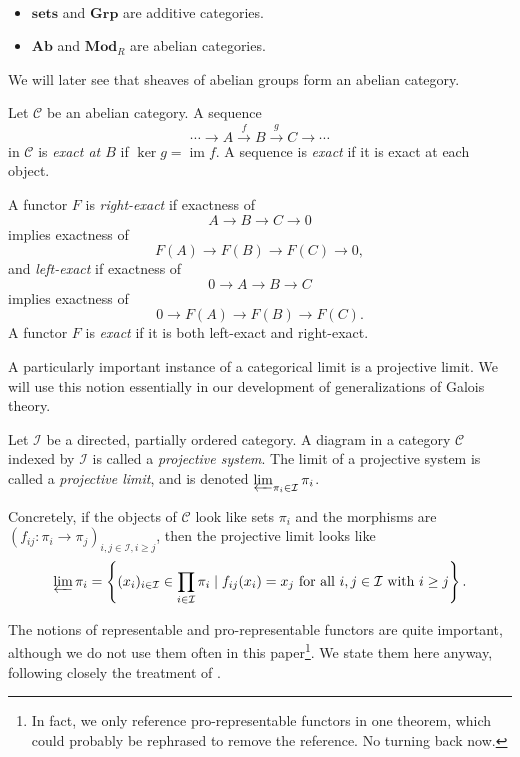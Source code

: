\documentclass[11pt,openany]{book} %
\begin{document}
\begin{example}\
	\begin{itemize}
	\item $\mathbf{sets}$ and $\mathbf{Grp}$ are additive categories.
	\item $\mathbf{Ab}$ and $\mathbf{Mod}_R$ are abelian categories.
    \end{itemize}
We will later see that sheaves of abelian groups form an abelian category.
\end{example}

\begin{definition}
Let $\mathcal{C}$ be an abelian category. A sequence
\[
\cdots \rightarrow A \xrightarrow{f} B \xrightarrow{g} C \rightarrow \cdots
\]
in $\mathcal{C}$ is \emph{exact at $B$} if $\operatorname{ker} g = \operatorname{im} f$. A sequence is \emph{exact} if it is exact at each object.

A functor $F$ is \emph{right-exact} if exactness of
\[
A \to B \to C \to 0
\]
implies exactness of
\[
F(A) \to F(B) \to F(C) \to 0,
\]
and \emph{left-exact} if exactness of 
\[
0 \to A \to B \to C
\]
implies exactness of
\[
0 \to F(A) \to F(B) \to F(C).
\]
A functor $F$ is \emph{exact} if it is both left-exact and right-exact.
\end{definition}

A particularly important instance of a categorical limit is a projective limit. We will use this notion essentially in our development of generalizations of Galois theory.\\

\begin{definition}
Let $\mathcal{I}$ be a directed, partially ordered category. A diagram in a category $\mathcal{C}$ indexed by $\mathcal{I}$ is called a \emph{projective system}. The limit of a projective system is called a \emph{projective limit}, and is denoted $\varprojlim_{\pi_i \in \mathcal{I}} \pi_i$.
\end{definition}

Concretely, if the objects of $\mathcal{C}$ look like sets $\pi_i$ and the morphisms are $(f_{ij} : \pi_i \to \pi_j)_{i,j \in \mathcal{I}, i \geq j}$, then the projective limit looks like
\[
\varprojlim \pi_i = \left\{(x_i)_{i \in \mathcal{I}} \in \prod_{i \in \mathcal{I}} \pi_i \mid f_{ij}(x_i) = x_j \text{ for all } i,j \in \mathcal{I} \text{ with } i \geq j\right\}.
\]

The notions of representable and pro-representable functors are quite important, although we do not use them often in this paper\footnote{In fact, we only reference pro-representable functors in one theorem, which could probably be rephrased to remove the reference. No turning back now.}. We state them here anyway, following closely the treatment of \cite{szamuely}.\\
\end{document}
